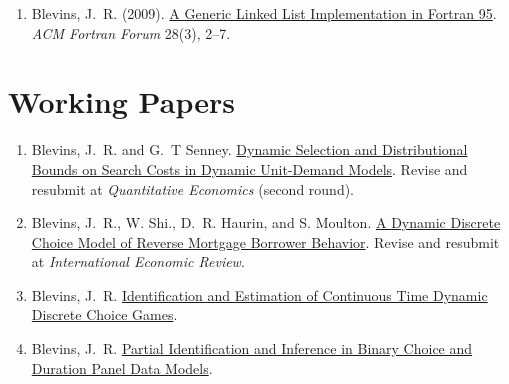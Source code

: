 \documentclass[10pt,letterpaper]{article}
\renewenvironment{itemize}{
  \begin{list}{}{
      \setlength{\leftmargin}{1.5em}
      \setlength{\itemsep}{0.25em}
      \setlength{\parskip}{0pt}
      \setlength{\parsep}{0.25em}
    }
}{
  \end{list}
}
\begin{document}
\begin{enumerate}[resume]
\item Blevins, J.~R. (2009).
  \href{https://jblevins.org/research/generic-list}{A Generic Linked List Implementation in Fortran 95}.
  \textit{ACM Fortran Forum} 28(3), 2--7.
\end{enumerate}

\section*{Working Papers}

\begin{enumerate}[resume]
\item Blevins, J.~R. and G.~T Senney.
  \href{https://jblevins.org/research/dcs}{Dynamic Selection and Distributional Bounds on Search Costs in Dynamic Unit-Demand Models}.
  Revise and resubmit at \textit{Quantitative Economics} (second round).
\item Blevins, J.~R., W. Shi., D.~R. Haurin, and S. Moulton.
  \href{https://jblevins.org/research/ddc-hecm}{A Dynamic Discrete Choice Model of Reverse Mortgage Borrower Behavior}.
  Revise and resubmit at \textit{International Economic Review}.
\item Blevins, J.~R.
  \href{https://jblevins.org/research/ctgames}{Identification and Estimation of Continuous Time Dynamic Discrete Choice Games}.
\item Blevins, J.~R.
  \href{https://jblevins.org/research/panel}{Partial Identification and Inference in Binary Choice and Duration Panel Data Models}.
\end{enumerate}



%
\end{document}
